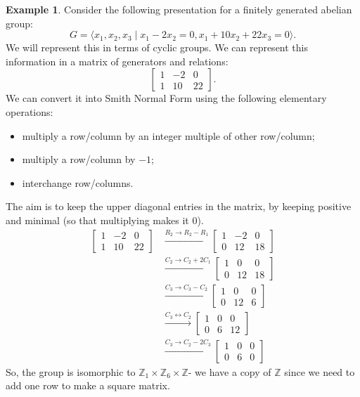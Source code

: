 \documentclass[a4paper, openany]{memoir}
\theoremstyle{definition}
\newtheorem{example}[definition]{Example}
\theoremstyle{plain}
\begin{document}
    \begin{example}
        Consider the following presentation for a finitely generated abelian group:
        \[G = \langle x_1, x_2, x_3 \mid x_1 - 2x_2 = 0, x_1 + 10x_2 + 22x_3 =0 \rangle.\]
        We will represent this in terms of cyclic groups. We can represent this information in a matrix of generators and relations:
        \[\begin{bmatrix}
            1 & -2 & 0 \\
            1 & 10 & 22
        \end{bmatrix}.\]
        We can convert it into Smith Normal Form using the following elementary operations:
        \begin{itemize}
            \item multiply a row/column by an integer multiple of other row/column;
            \item multiply a row/column by $-1$;
            \item interchange row/columns.
        \end{itemize}
        The aim is to keep the upper diagonal entries in the matrix, by keeping positive and minimal (so that multiplying makes it 0).
        \begin{align*}
            \begin{bmatrix}
                1 & -2 & 0 \\
                1 & 10 & 22
            \end{bmatrix} &\xrightarrow{R_2 \to R_2 - R_1} \begin{bmatrix}
                1 & -2 & 0 \\
                0 & 12 & 18
            \end{bmatrix} \\
            &\xrightarrow{C_2 \to C_2 + 2C_1} \begin{bmatrix}
                1 & 0 & 0 \\
                0 & 12 & 18
            \end{bmatrix} \\
            &\xrightarrow{C_3 \to C_3 - C_2} \begin{bmatrix}
                1 & 0 & 0 \\
                0 & 12 & 6
            \end{bmatrix} \\
            &\xrightarrow{C_3 \leftrightarrow C_2} \begin{bmatrix}
                1 & 0 & 0 \\
                0 & 6 & 12
            \end{bmatrix} \\
            &\xrightarrow{C_3 \to C_2 - 2C_3} \begin{bmatrix}
                1 & 0 & 0 \\
                0 & 6 & 0
            \end{bmatrix} 
        \end{align*}
        So, the group is isomorphic to $\mathbb{Z}_1 \times \mathbb{Z}_6 \times \mathbb{Z}$- we have a copy of $\mathbb{Z}$ since we need to add one row to make a square matrix.
    \end{example}
\end{document}
